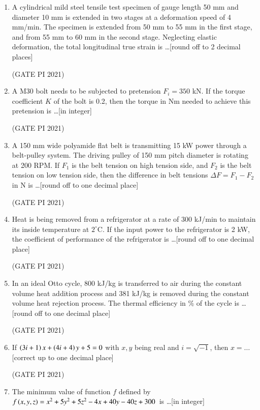 \documentclass[journal,12pt,onecolumn]{IEEEtran}
\theoremstyle{remark}
\begin{document}
\begin{enumerate}
\item
A cylindrical mild steel tensile test specimen of gauge length 50 mm and diameter 10 mm is extended in two stages at a deformation speed of 4 mm/min. The specimen is extended from 50 mm to 55 mm in the first stage, and from 55 mm to 60 mm in the second stage. Neglecting elastic deformation, the total longitudinal true strain is \dots [round off to 2 decimal places]

\hfill (GATE PI 2021)

\item
A M30 bolt needs to be subjected to pretension $F_i = 350$ kN. If the torque coefficient $K$ of the bolt is 0.2, then the torque in Nm needed to achieve this pretension is \dots [in integer]

\hfill (GATE PI 2021)

\item
A 150 mm wide polyamide flat belt is transmitting 15 kW power through a belt-pulley system. The driving pulley of 150 mm pitch diameter is rotating at 200 RPM. If $F_1$ is the belt tension on high tension side, and $F_2$ is the belt tension on low tension side, then the difference in belt tensions $\Delta F = F_1 - F_2$ in N is \dots [round off to one decimal place]

\hfill (GATE PI 2021)

\item
Heat is being removed from a refrigerator at a rate of 300 kJ/min to maintain its inside temperature at $2^\circ$C. If the input power to the refrigerator is 2 kW, the coefficient of performance of the refrigerator is \dots [round off to one decimal place]

\hfill (GATE PI 2021)

\item
In an ideal Otto cycle, 800 kJ/kg is transferred to air during the constant volume heat addition process and 381 kJ/kg is removed during the constant volume heat rejection process. The thermal efficiency in \% of the cycle is \dots [round off to one decimal place]

\hfill (GATE PI 2021)

\item
If $\left(3i + 1\right)x + \left(4i + 4\right)y + 5 = 0$ with $x, y$ being real and $i = \sqrt{-1}$, then $x = \dots$ [correct up to one decimal place]

\hfill (GATE PI 2021)

\item
The minimum value of function $f$ defined by\
$f\left(x, y, z\right) = x^2 + 5y^2 + 5z^2 - 4x + 40y - 40z + 300$\
is \dots [in integer]


\end{enumerate}
\end{document}

